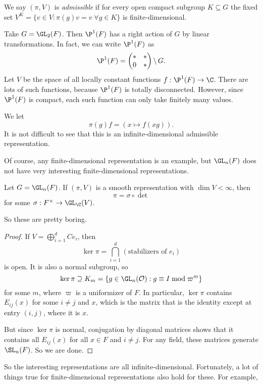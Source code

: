 \documentclass[a4paper]{article}
\begin{document}
\begin{defi}
  We say $(\pi, V)$ is \emph{admissible} if for every open compact subgroup $K \subseteq G$ the fixed set $V^K = \{v \in V: \pi(g)v = v\;\forall g \in K\}$ is finite-dimensional.
\end{defi}

\begin{eg}
  Take $G = \GL_2(F)$. Then $\P^1(F)$ has a right action of $G$ by linear transformations. In fact, we can write $\P^1(F)$ as
  \[
    \P^1(F) =
    \begin{pmatrix}
      * & *\\
      0 & *
    \end{pmatrix} \backslash \,G.
  \]
  Let $V$ be the space of all locally constant functions $f: \P^1(F) \to \C$. There are lots of such functions, because $\P^1(F)$ is totally disconnected. However, since $\P^1(F)$ is compact, each such function can only take finitely many values.

  We let
  \[
    \pi(g) f = (x \mapsto f(xg)).
  \]
  It is not difficult to see that this is an infinite-dimensional admissible representation.
\end{eg}
Of course, any finite-dimensional representation is an example, but $\GL_n(F)$ does not have very interesting finite-dimensional representations.

\begin{prop}
  Let $G = \GL_n(F)$. If $(\pi, V)$ is a smooth representation with $\dim V < \infty$, then
  \[
    \pi = \sigma \circ \det
  \]
  for some $\sigma: F^\times \to \GL_\C(V)$.
\end{prop}
So these are pretty boring.

\begin{proof}
  If $V = \bigoplus_{i = 1}^d C e_i$, then
  \[
    \ker \pi = \bigcap_{i = 1}^d (\text{stabilizers of }e_i)
  \]
  is open. It is also a normal subgroup, so
  \[
    \ker \pi \supseteq K_m = \{g \in \GL_n(\mathcal{O}) : g \equiv I \bmod {\varpi^m}\}
  \]
  for some $m$, where $\varpi$ is a uniformizer of $F$. In particular, $\ker \pi$ contains $E_{ij}(x)$ for some $i \not= j$ and $x$, which is the matrix that is the identity except at entry $(i, j)$, where it is $x$.

  But since $\ker \pi$ is normal, conjugation by diagonal matrices shows that it contains all $E_{ij}(x)$ for all $x \in F$ and $i \not= j$. For any field, these matrices generate $\SL_n(F)$. So we are done.
\end{proof}
So the interesting representations are all infinite-dimensional. Fortunately, a lot of things true for finite-dimensional representations also hold for these. For example,
\end{document}

